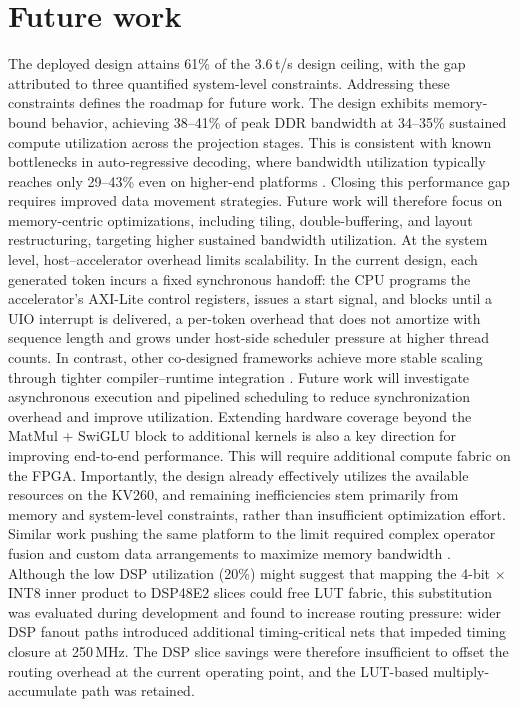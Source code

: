 \documentclass[manuscript,]{acmart} %
\begin{document}
\section{Future work}
The deployed design attains 61\% of the 3.6\,t/s design ceiling, with the gap attributed to three quantified system-level constraints. Addressing these constraints defines the roadmap for future work.
The design exhibits memory-bound behavior, achieving 38--41\% of peak DDR bandwidth at 34--35\% sustained compute utilization across the projection stages. This is consistent with known bottlenecks in auto-regressive decoding, where bandwidth utilization typically reaches only 29--43\% even on higher-end platforms \cite{FlightLLM}. Closing this performance gap requires improved data movement strategies. Future work will therefore focus on memory-centric optimizations, including tiling, double-buffering, and layout restructuring, targeting higher sustained bandwidth utilization.
At the system level, host–accelerator overhead limits scalability.
In the current design, each generated token incurs a fixed synchronous handoff: the CPU programs the accelerator's AXI-Lite control registers, issues a start signal, and blocks until a UIO interrupt is delivered, a per-token overhead that does not amortize with sequence length and grows under host-side scheduler pressure at higher thread counts.
In contrast, other co-designed frameworks achieve more stable scaling through tighter compiler–runtime integration \cite{cano}. Future work will investigate asynchronous execution and pipelined scheduling to reduce synchronization overhead and improve utilization.
Extending hardware coverage beyond the MatMul + SwiGLU block to additional kernels is also a key direction for improving end-to-end performance. This will require additional compute fabric on the FPGA.
Importantly, the design already effectively utilizes the available resources on the KV260, and remaining inefficiencies stem primarily from memory and system-level constraints, rather than insufficient optimization effort. Similar work pushing the same platform to the limit required complex operator fusion and custom data arrangements to maximize memory bandwidth \cite{Li2025Pushing}.
Although the low DSP utilization (20\%) might suggest that mapping the 4-bit $\times$ INT8 inner product to DSP48E2 slices could free LUT fabric, this substitution was evaluated during development and found to increase routing pressure: wider DSP fanout paths introduced additional timing-critical nets that impeded timing closure at 250\,MHz. The DSP slice savings were therefore insufficient to offset the routing overhead at the current operating point, and the LUT-based multiply-accumulate path was retained.
\end{document}
